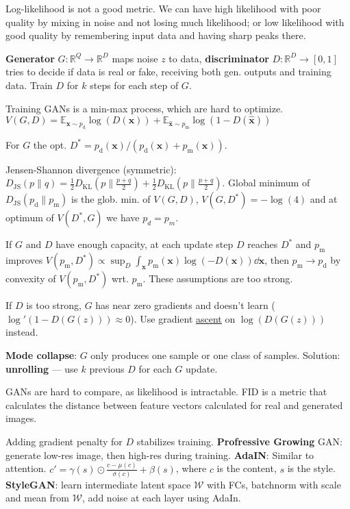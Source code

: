 \documentclass[11pt,landscape,a4paper,fleqn]{article}
\newcommand{\kl}[2]{D_{\mathrm{KL}}(#1\lVert#2)}
\newcommand{\js}[2]{D_{\mathrm{JS}}(#1\lVert#2)}
\newcommand{\E}{\mathbb{E}}
\newcommand{\R}{\mathbb{R}}
\def\myvector#1{\mathbf{#1}}
\def\vx{{\myvector{x}}}
\begin{document}
\begin{multicols*}{4}
Log-likelihood is not a good metric. We can have high likelihood with poor quality by mixing in noise and not losing much likelihood; or low likelihood with good quality by remembering input data and having sharp peaks there.

\textbf{Generator} $G : \R^Q \to \R^D$ maps noise $z$ to data,
\textbf{discriminator} $D : \R^D \to [0, 1]$ tries to decide if data is real or fake,
receiving both gen. outputs and training data.
Train $D$ for $k$ steps for each step of $G$.

Training GANs is a min-max process, which are hard to optimize.
$V(G, D) = \E_{\vx \sim p_{\mathrm{d}}} \log(D(\vx)) + \E_{\hat{\vx} \sim p_{\mathrm{m}}} \log(1 - D(\hat{\vx}))$

For $G$ the opt. $D^* = p_{\mathrm{d}}(\vx) / (p_{\mathrm{d}}(\vx) + p_{\mathrm{m}}(\vx))$.

Jensen-Shannon divergence (symmetric):
$\js{p}{q} = \frac{1}{2} \kl{p}{\frac{p + q}{2}} + \frac{1}{2} \kl{p}{\frac{p + q}{2}}$.
Global minimum of $\js{p_{\mathrm{d}}}{p_{\mathrm{m}}}$ is the glob. min. of $V(G, D)$,
$V(G, D^*) = - \log(4)$ and at optimum of $V(D^*, G)$ we have $p_d = p_m$.

If $G$ and $D$ have enough capacity, at each update step $D$ reaches $D^*$
and $p_{\mathrm{m}}$ improves $V(p_{\mathrm{m}}, D^*) \propto \sup_D \int_{\vx} p_{\mathrm{m}}(\vx) \log( - D(\vx)) \dd \vx$,
then $p_{\mathrm{m}} \to p_{\mathrm{d}}$ by convexity of $V(p_{\mathrm{m}}, D^*)$ wrt. $p_{\mathrm{m}}$.
These assumptions are too strong.

If $D$ is too strong, $G$ has near zero gradients and doesn't learn ($\log'(1 - D(G(z))) \approx 0$).
Use gradient \underline{ascent} on $\log(D(G(z)))$ instead.

\textbf{Mode collapse}: $G$ only produces one sample or one class of samples.
Solution: \textbf{unrolling} --- use $k$ previous $D$ for each $G$ update.

GANs are hard to compare, as likelihood is intractable.
FID is a metric that calculates the distance between feature vectors
calculated for real and generated images.


Adding gradient penalty for $D$ stabilizes training.
\textbf{Profressive Growing} GAN: generate low-res image, then high-res during training.
\textbf{AdaIN}: Similar to attention. $c' = \gamma(s) \odot \frac{c - \mu (c)}{\sigma(c)} + \beta(s)$, where $c$ is the content, $s$ is the style.
\textbf{StyleGAN}: learn intermediate latent space $\mathcal{W}$ with FCs,
batchnorm with scale and mean from $\mathcal{W}$, add noise at each layer using AdaIn.


\end{multicols*}
\end{document}
